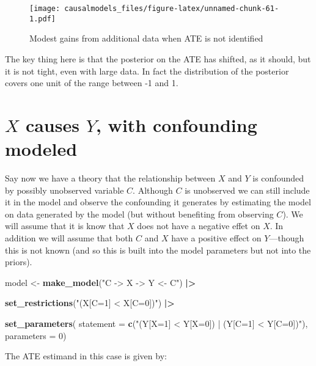 \documentclass[
  12pt,
]{book}
\newenvironment{Shaded}{\begin{snugshade}}{\end{snugshade}}
\newcommand{\AttributeTok}[1]{\textcolor[rgb]{0.13,0.29,0.53}{#1}}
\newcommand{\DecValTok}[1]{\textcolor[rgb]{0.00,0.00,0.81}{#1}}
\newcommand{\FunctionTok}[1]{\textcolor[rgb]{0.13,0.29,0.53}{\textbf{#1}}}
\newcommand{\NormalTok}[1]{#1}
\newcommand{\OtherTok}[1]{\textcolor[rgb]{0.56,0.35,0.01}{#1}}
\newcommand{\SpecialCharTok}[1]{\textcolor[rgb]{0.81,0.36,0.00}{\textbf{#1}}}
\newcommand{\StringTok}[1]{\textcolor[rgb]{0.31,0.60,0.02}{#1}}
\begin{document}
\begin{figure}
\centering
\texttt{[image: causalmodels\_files/figure-latex/unnamed-chunk-61-1.pdf]}
\caption{\label{fig:unnamed-chunk-61}Modest gains from additional data when ATE is not identified}
\end{figure}

The key thing here is that the posterior on the ATE has shifted, as it should, but it is not tight, even with large data. In fact the distribution of the posterior covers one unit of the range between -1 and 1.

\hypertarget{x-causes-y-with-confounding-modeled}{%
\section{\texorpdfstring{\(X\) causes \(Y\), with confounding modeled}{X causes Y, with confounding modeled}}\label{x-causes-y-with-confounding-modeled}}

Say now we have a theory that the relationship between \(X\) and \(Y\) is confounded by possibly unobserved variable \(C\). Although \(C\) is unobserved we can still include it in the model and observe the confounding it generates by estimating the model on data generated by the model (but without benefiting from observing \(C\)).
We will assume that it is know that \(X\) does not have a negative effet on \(X\). In addition we will assume that both \(C\) and \(X\) have a positive effect on \(Y\)---though this is not known (and so this is built into the model parameters but not into the priors).

\begin{Shaded}
\begin{Highlighting}[]
\NormalTok{model }\OtherTok{\textless{}{-}} \FunctionTok{make\_model}\NormalTok{(}\StringTok{"C {-}\textgreater{} X {-}\textgreater{} Y \textless{}{-} C"}\NormalTok{) }\SpecialCharTok{|\textgreater{}}
  
  \FunctionTok{set\_restrictions}\NormalTok{(}\StringTok{"(X[C=1] \textless{} X[C=0])"}\NormalTok{) }\SpecialCharTok{|\textgreater{}}

  \FunctionTok{set\_parameters}\NormalTok{(}
           \AttributeTok{statement =} \FunctionTok{c}\NormalTok{(}\StringTok{"(Y[X=1] \textless{} Y[X=0]) | (Y[C=1] \textless{} Y[C=0])"}\NormalTok{), }
           \AttributeTok{parameters =} \DecValTok{0}\NormalTok{)}
\end{Highlighting}
\end{Shaded}

The ATE estimand in this case is given by:
\end{document}
